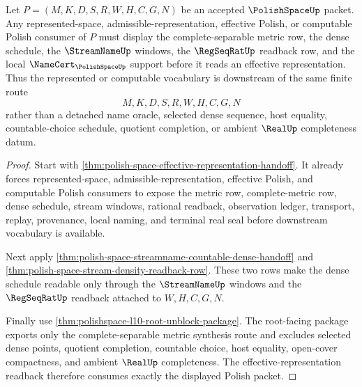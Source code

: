 \begin{theorem}
\label{thm:polish-space-effective-representation-separable-readback}
Let $P=(M,K,D,S,R,W,H,C,G,N)$ be an accepted $\PolishSpaceUp$ packet. Any represented-space, admissible-representation, effective Polish, or computable Polish consumer of $P$ must display the complete-separable metric row, the dense schedule, the $\StreamNameUp$ windows, the $\RegSeqRatUp$ readback row, and the local $\NameCert_{\PolishSpaceUp}$ support before it reads an effective representation. Thus the represented or computable vocabulary is downstream of the same finite route
$$
M,K,D,S,R,W,H,C,G,N
$$
rather than a detached name oracle, selected dense sequence, host equality, countable-choice schedule, quotient completion, or ambient $\RealUp$ completeness datum.
\end{theorem}
\begin{proof}
Start with \autoref{thm:polish-space-effective-representation-handoff}. It already forces represented-space, admissible-representation, effective Polish, and computable Polish consumers to expose the metric row, complete-metric row, dense schedule, stream windows, rational readback, observation ledger, transport, replay, provenance, local naming, and terminal real seal before downstream vocabulary is available.

Next apply \autoref{thm:polish-space-streamname-countable-dense-handoff} and \autoref{thm:polish-space-stream-density-readback-row}. These two rows make the dense schedule readable only through the $\StreamNameUp$ windows and the $\RegSeqRatUp$ readback attached to $W,H,C,G,N$.

Finally use \autoref{thm:polishspace-l10-root-unblock-package}. The root-facing package exports only the complete-separable metric synthesis route and excludes selected dense points, quotient completion, countable choice, host equality, open-cover compactness, and ambient $\RealUp$ completeness. The effective-representation readback therefore consumes exactly the displayed Polish packet.
\end{proof}
